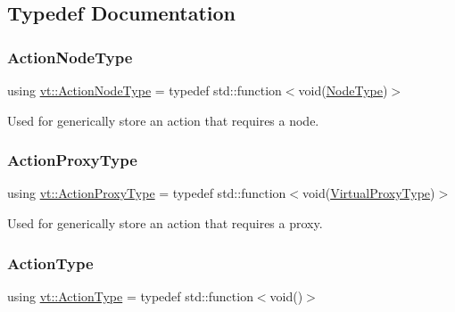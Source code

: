 \subsection{Typedef Documentation}
\mbox{\label{namespacevt_a0436cb2d620dcbb21b5b49cd9c9c4749}} 
\subsubsection{\texorpdfstring{Action\+Node\+Type}{ActionNodeType}}
{\footnotesize\ttfamily using \hyperlink{namespacevt_a0436cb2d620dcbb21b5b49cd9c9c4749}{vt\+::\+Action\+Node\+Type} = typedef std\+::function$<$void(\hyperlink{namespacevt_a866da9d0efc19c0a1ce79e9e492f47e2}{Node\+Type})$>$}



Used for generically store an action that requires a node. 

\mbox{\label{namespacevt_a102aa105d64254d89f7e585d106c95aa}} 
\subsubsection{\texorpdfstring{Action\+Proxy\+Type}{ActionProxyType}}
{\footnotesize\ttfamily using \hyperlink{namespacevt_a102aa105d64254d89f7e585d106c95aa}{vt\+::\+Action\+Proxy\+Type} = typedef std\+::function$<$void(\hyperlink{namespacevt_a1b417dd5d684f045bb58a0ede70045ac}{Virtual\+Proxy\+Type})$>$}



Used for generically store an action that requires a proxy. 

\mbox{\label{namespacevt_ae0a5a7b18cc99d7b732cb4d44f46b0f3}} 
\subsubsection{\texorpdfstring{Action\+Type}{ActionType}}
{\footnotesize\ttfamily using \hyperlink{namespacevt_ae0a5a7b18cc99d7b732cb4d44f46b0f3}{vt\+::\+Action\+Type} = typedef std\+::function$<$void()$>$}



